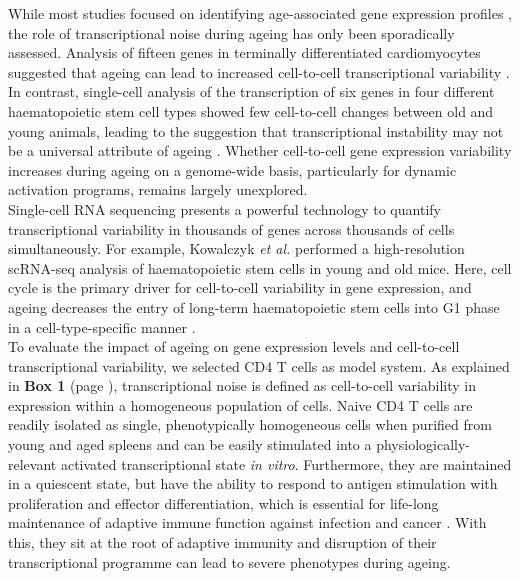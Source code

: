 While most studies focused on identifying age-associated gene expression profiles \citep{DeMagalhaes2009}, the role of transcriptional noise during ageing has only been sporadically assessed. Analysis of fifteen genes in terminally differentiated cardiomyocytes suggested that ageing can lead to increased cell-to-cell transcriptional variability \citep{Bahar2006}. In contrast, single-cell analysis of the transcription of six genes in four different haematopoietic stem cell types showed few cell-to-cell changes between old and young animals, leading to the suggestion that transcriptional instability may not be a universal attribute of ageing \citep{Warren2007}. Whether cell-to-cell gene expression variability increases during ageing on a genome-wide basis, particularly for dynamic activation programs, remains largely unexplored.\\

Single-cell RNA sequencing presents a powerful technology to quantify  transcriptional variability in thousands of genes across thousands of cells simultaneously. For example, Kowalczyk \textit{et al.} performed a high-resolution scRNA-seq analysis of haematopoietic stem cells in young and old mice. Here, cell cycle is the primary driver for cell-to-cell variability in gene expression, and ageing decreases the entry of long-term haematopoietic stem cells into G1 phase in a cell-type-specific manner \citep{Kowalczyk2015}.\\ 

To evaluate the impact of ageing on gene expression levels and cell-to-cell transcriptional variability, we selected CD4\plus{} T cells as model system. As explained in \textbf{Box 1} (page \pageref{box1}), transcriptional noise is defined as cell-to-cell variability in expression within a homogeneous population of cells. Naive CD4\plus{} T cells are readily isolated as single, phenotypically homogeneous cells when purified from young and aged spleens and can be easily stimulated into a physiologically-relevant activated transcriptional state \emph{in vitro}. Furthermore, they are maintained in a quiescent state, but have the ability to respond to antigen stimulation with proliferation and effector differentiation, which is essential for life-long maintenance of adaptive immune function against infection and cancer \citep{Swain2012, Kim2014a}. With this, they sit at the root of adaptive immunity and disruption of their transcriptional programme can lead to severe phenotypes during ageing. \\

